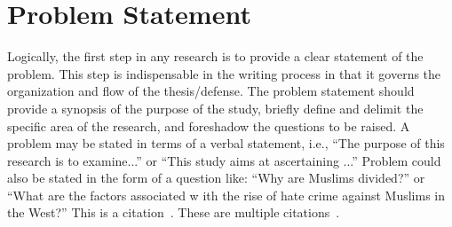 \section{Problem Statement} \label{problem}

Logically, the first step in any research is to provide a clear statement of
the problem. This step is indispensable in the writing process in that it
governs the organization and flow of the thesis/defense. The problem statement
should provide a synopsis of the purpose of the study, briefly define and
delimit the specific area of the research, and foreshadow the questions to be
raised. A problem may be stated in terms of a verbal statement, i.e., ``The
purpose of this research is to examine...'' or ``This study aims at
ascertaining ...'' Problem could also be stated in the form of a question
like: ``Why are Muslims divided?'' or ``What are the factors associated w ith
the rise of hate crime against Muslims in the West?''
This is a citation~\cite{utk:idr2016optimization}.
These are multiple citations~\cite{utk:rdf2018jac,utk:hspwrap2015blast,pupr:plasma2014fpga,ornl:sensorfusion2012}.
